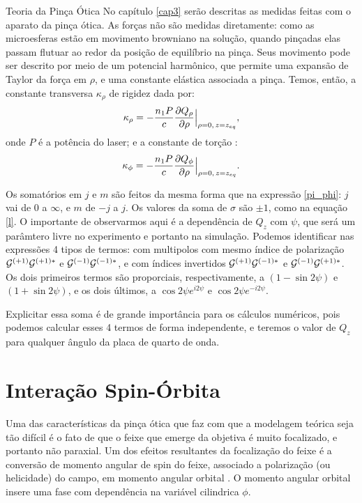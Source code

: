 \begin{chapter}{Teoria da Pinça Ótica}
No capítulo \ref{cap3} serão descritas as medidas feitas com o aparato da pinça ótica. As forças não são medidas diretamente: como as microesferas estão em movimento browniano na solução, quando pinçadas elas passam flutuar ao redor da posição de equilíbrio na pinça. Seus movimento pode ser descrito por meio de um potencial harmônico, que permite uma expansão de Taylor da força em $\rho$, e uma constante elástica associada a pinça. Temos, então, a constante transversa $\kappa_\rho$ de rigidez dada por\cite{Viana2007}:
%
\begin{equation}
\kappa_\rho=-\frac{n_1 P}{c}\frac{\partial Q_\rho}{\partial \rho}\Big{|}_{\rho=0, \thinspace z=z_{eq}},
\label{kphi}
\end{equation}
%
onde $P$ é a potência do laser; e a constante de torção \cite{Diniz2019}:
%
\begin{equation}
\kappa_\phi=-\frac{n_1 P}{c}\frac{\partial Q_\phi}{\partial \rho}\Big{|}_{\rho=0, \thinspace z=z_{eq}}.
\label{kphi}
\end{equation}
%

Os somatórios em $j$ e $m$ são feitos da mesma forma que na expressão \ref{pi_phi}: $j$ vai de $0$ a $\infty$, e $m$ de $-j$ a $j$. Os valores da soma de $\sigma$ são $\pm1$, como na equação \ref{l}. O importante de observarmos aqui é a dependência de $Q_z$ com $\psi$, que será um parâmtero livre no experimento e portanto na simulação. Podemos identificar nas expressões 4 tipos de termos: com multipolos com mesmo índice de polarização $\mathcal G^{(+1)}\mathcal G^{(+1)*}$ e $\mathcal G^{(-1)}\mathcal G^{(-1)*}$, e com índices invertidos $\mathcal G^{(+1)}\mathcal G^{(-1)*}$ e $\mathcal G^{(-1)}\mathcal G^{(+1)*}$. Os dois primeiros termos são proporciais, respectivamente, a $(1-\sin2\psi)$ e $(1+\sin2\psi)$, e os dois últimos, a $\cos2\psi e^{i2\psi}$ e $\cos2\psi e^{-i2\psi}$.

Explicitar essa soma é de grande importância para os cálculos numéricos, pois podemos calcular esses 4 termos de forma independente, e teremos o valor de $Q_z$ para qualquer ângulo da placa de quarto de onda.

\section{Interação Spin-Órbita}
\label{interacao_so}

\hspace{5 mm}Uma das características da pinça ótica que faz com que a modelagem teórica seja tão difícil é o fato de que o feixe que emerge da objetiva é muito focalizado, e portanto não paraxial. Um dos efeitos resultantes da focalização do feixe é a conversão de momento angular de spin do feixe, associado a polarização (ou helicidade) do campo, em momento angular orbital \cite{Bliokh2015}. O momento angular orbital insere uma fase com dependência na variável cilindrica $\phi$.


\end{chapter}
